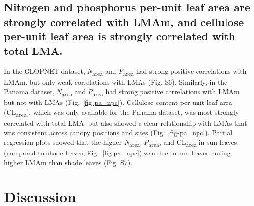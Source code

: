 \documentclass[
  12pt,
  letterpaper,
  DIV=11,
  numbers=noendperiod]{scrartcl}
\begin{document}
\subsection{Nitrogen and phosphorus per-unit leaf area are strongly
correlated with LMAm, and cellulose per-unit leaf area is strongly
correlated with total
LMA.}\label{nitrogen-and-phosphorus-per-unit-leaf-area-are-strongly-correlated-with-lmam-and-cellulose-per-unit-leaf-area-is-strongly-correlated-with-total-lma.}

In the GLOPNET dataset, \emph{N}\textsubscript{area} and
\emph{P}\textsubscript{area} had strong positive correlations with LMAm,
but only weak correlations with LMAs (Fig. S6). Similarly, in the Panama
dataset, \emph{N}\textsubscript{area} and \emph{P}\textsubscript{area}
had strong positive correlations with LMAm but not with LMAs
(Fig.~\ref{fig-pa_npc}). Cellulose content per-unit leaf area
(CL\textsubscript{area}), which was only available for the Panama
dataset, was most strongly correlated with total LMA, but also showed a
clear relationship with LMAs that was consistent across canopy positions
and sites (Fig.~\ref{fig-pa_npc}). Partial regression plots showed that
the higher \emph{N}\textsubscript{area}, \emph{P}\textsubscript{area},
and CL\textsubscript{area} in sun leaves (compared to shade leaves;
Fig.~\ref{fig-pa_npc}) was due to sun leaves having higher LMAm than
shade leaves (Fig. S7).

\section{Discussion}\label{discussion}
\end{document}
